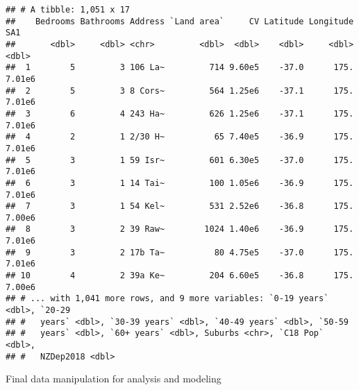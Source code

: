 \documentclass[
]{article}
\newenvironment{Shaded}{\begin{snugshade}}{\end{snugshade}}
\newcommand{\DataTypeTok}[1]{\textcolor[rgb]{0.13,0.29,0.53}{#1}}
\newcommand{\DecValTok}[1]{\textcolor[rgb]{0.00,0.00,0.81}{#1}}
\newcommand{\KeywordTok}[1]{\textcolor[rgb]{0.13,0.29,0.53}{\textbf{#1}}}
\newcommand{\NormalTok}[1]{#1}
\newcommand{\OperatorTok}[1]{\textcolor[rgb]{0.81,0.36,0.00}{\textbf{#1}}}
\newcommand{\StringTok}[1]{\textcolor[rgb]{0.31,0.60,0.02}{#1}}
\begin{document}
\begin{verbatim}
## # A tibble: 1,051 x 17
##    Bedrooms Bathrooms Address `Land area`     CV Latitude Longitude    SA1
##       <dbl>     <dbl> <chr>         <dbl>  <dbl>    <dbl>     <dbl>  <dbl>
##  1        5         3 106 La~         714 9.60e5    -37.0      175. 7.01e6
##  2        5         3 8 Cors~         564 1.25e6    -37.1      175. 7.01e6
##  3        6         4 243 Ha~         626 1.25e6    -37.1      175. 7.01e6
##  4        2         1 2/30 H~          65 7.40e5    -36.9      175. 7.01e6
##  5        3         1 59 Isr~         601 6.30e5    -37.0      175. 7.01e6
##  6        3         1 14 Tai~         100 1.05e6    -36.9      175. 7.01e6
##  7        3         1 54 Kel~         531 2.52e6    -36.8      175. 7.00e6
##  8        3         2 39 Raw~        1024 1.40e6    -36.9      175. 7.01e6
##  9        3         2 17b Ta~          80 4.75e5    -37.0      175. 7.01e6
## 10        4         2 39a Ke~         204 6.60e5    -36.8      175. 7.00e6
## # ... with 1,041 more rows, and 9 more variables: `0-19 years` <dbl>, `20-29
## #   years` <dbl>, `30-39 years` <dbl>, `40-49 years` <dbl>, `50-59
## #   years` <dbl>, `60+ years` <dbl>, Suburbs <chr>, `C18 Pop` <dbl>,
## #   NZDep2018 <dbl>
\end{verbatim}

Final data manipulation for analysis and modeling

\begin{Shaded}
\end{Shaded}
\end{document}
